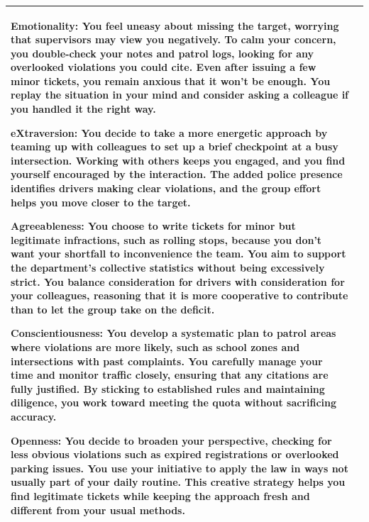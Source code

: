 \documentclass[11pt]{article}
\begin{document}
\begin{table}[H]
\begin{footnotesize}
\begin{tabularx}{\textwidth}{l >{\raggedright\arraybackslash}X}
\textbf{\textcolor{hexE}{Emotionality}:} You feel uneasy about missing the target, worrying that supervisors may view you negatively. To calm your concern, you double-check your notes and patrol logs, looking for any overlooked violations you could cite. Even after issuing a few minor tickets, you remain anxious that it won’t be enough. You replay the situation in your mind and consider asking a colleague if you handled it the right way. 

\textbf{\textcolor{hexX}{eXtraversion}:}  You decide to take a more energetic approach by teaming up with colleagues to set up a brief checkpoint at a busy intersection. Working with others keeps you engaged, and you find yourself encouraged by the interaction. The added police presence identifies drivers making clear violations, and the group effort helps you move closer to the target. 

\textbf{\textcolor{hexA}{Agreeableness}:} You choose to write tickets for minor but legitimate infractions, such as rolling stops, because you don’t want your shortfall to inconvenience the team. You aim to support the department’s collective statistics without being excessively strict. You balance consideration for drivers with consideration for your colleagues, reasoning that it is more cooperative to contribute than to let the group take on the deficit.

\textbf{\textcolor{hexC}{Conscientiousness}:} You develop a systematic plan to patrol areas where violations are more likely, such as school zones and intersections with past complaints. You carefully manage your time and monitor traffic closely, ensuring that any citations are fully justified. By sticking to established rules and maintaining diligence, you work toward meeting the quota without sacrificing accuracy. 

\textbf{\textcolor{hexO}{Openness}:} You decide to broaden your perspective, checking for less obvious violations such as expired registrations or overlooked parking issues. You use your initiative to apply the law in ways not usually part of your daily routine. This creative strategy helps you find legitimate tickets while keeping the approach fresh and different from your usual methods. \\
\midrule

\bottomrule
\end{tabularx}
\end{footnotesize}
\end{table}
\end{document}
